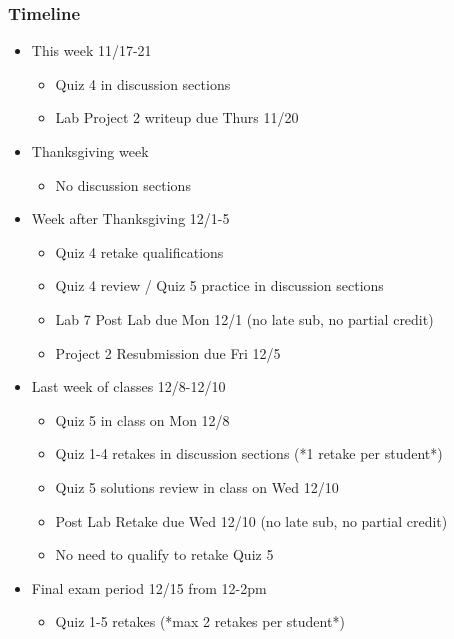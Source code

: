 \begin{frame}[shrink]
\frametitle{Timeline}
\begin{itemize}
    \item This week 11/17-21
    \begin{itemize}
        \item Quiz 4 in discussion sections
        \item Lab Project 2 writeup due Thurs 11/20
    \end{itemize}\pause
    \item Thanksgiving week
    \begin{itemize}
        \item No discussion sections
    \end{itemize}\pause
    \item Week after Thanksgiving 12/1-5
    \begin{itemize}
        \item Quiz 4 retake qualifications
        \item Quiz 4 review / Quiz 5 practice in discussion sections
        \item Lab 7 Post Lab due Mon 12/1 (no late sub, no partial credit)
        \item Project 2 Resubmission due Fri 12/5
    \end{itemize}\pause
    \item Last week of classes 12/8-12/10
    \begin{itemize}
        \item Quiz 5 in class on Mon 12/8
        \item Quiz 1-4 retakes in discussion sections (*1 retake per student*)
        \item Quiz 5 solutions review in class on Wed 12/10
        \item Post Lab Retake due Wed 12/10 (no late sub, no partial credit)
        \item No need to qualify to retake Quiz 5
    \end{itemize}\pause
    \item Final exam period 12/15 from 12-2pm
    \begin{itemize}
        \item Quiz 1-5 retakes (*max 2 retakes per student*)
    \end{itemize}
\end{itemize}
\end{frame}
